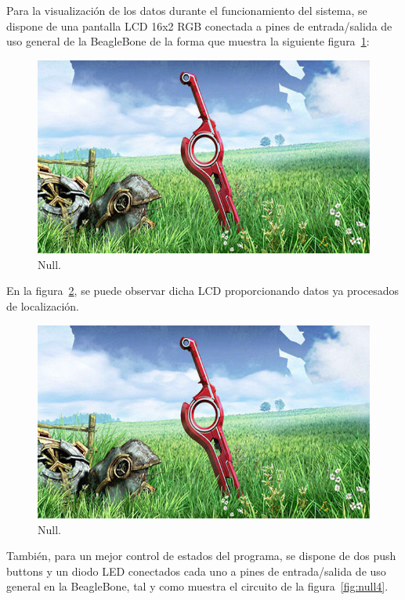 Para la visualización de los datos durante el funcionamiento del sistema, se dispone de una pantalla LCD 16x2 RGB conectada a pines de entrada/salida de uso general de la BeagleBone de la forma que muestra la siguiente figura~\ref{fig:null2}:

\begin{figure}[ht]
\centering
\includegraphics[scale=0.12]{Figures/null}
\caption[null.]{Null.\footnotemark}
\label{fig:null2}
\end{figure}


En la figura~\ref{fig:null3}, se puede observar dicha LCD proporcionando datos ya procesados de localización. 

\begin{figure}[ht]
\centering
\includegraphics[scale=0.12]{Figures/null}
\caption[null.]{Null.\footnotemark}
\label{fig:null3}
\end{figure}


También, para un mejor control de estados del programa, se dispone de dos push buttons y un diodo LED conectados cada uno a pines de entrada/salida de uso general en la BeagleBone, tal y como muestra el circuito de la figura~\ref{fig:null4}.

